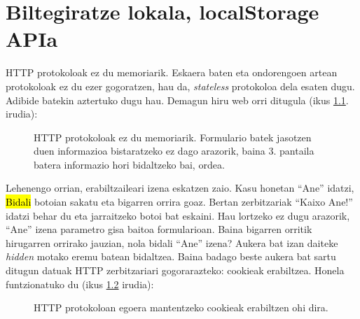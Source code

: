 \chapter{Biltegiratze lokala, localStorage APIa}

HTTP protokoloak ez du memoriarik. Eskaera baten eta ondorengoen artean protokoloak ez du ezer gogoratzen, hau da, \textit{stateless} protokoloa dela esaten dugu. Adibide batekin aztertuko dugu hau. Demagun hiru web orri ditugula (ikus \ref{fig:localstorage1}. irudia):

\begin{figure}[ht]
	\centering
{}
\caption{HTTP protokoloak ez du memoriarik. Formulario batek jasotzen duen informazioa bistaratzeko ez dago arazorik, baina 3. pantaila batera informazio hori bidaltzeko bai, ordea.}
\label{fig:localstorage1}
\end{figure}


Lehenengo orrian, erabiltzaileari izena eskatzen zaio. Kasu honetan ``Ane'' idatzi, \hl{Bidali} botoian sakatu eta bigarren orrira goaz. Bertan zerbitzariak ``Kaixo Ane!'' idatzi behar du eta jarraitzeko botoi bat eskaini. Hau lortzeko ez dugu arazorik, ``Ane'' izena parametro gisa baitoa formularioan. Baina bigarren orritik hirugarren orrirako jauzian, nola bidali ``Ane'' izena? Aukera bat izan daiteke \mbox{\textit{hidden}} motako eremu batean bidaltzea. Baina badago beste aukera bat sartu ditugun datuak HTTP zerbitzariari gogorarazteko: cookieak  erabiltzea. Honela funtzionatuko du (ikus \ref{fig:localstorage2} irudia):

\begin{figure}[ht]
	\centering
{}
\caption{HTTP protokoloan egoera mantentzeko cookieak erabiltzen ohi dira.}
\label{fig:localstorage2}
\end{figure}


